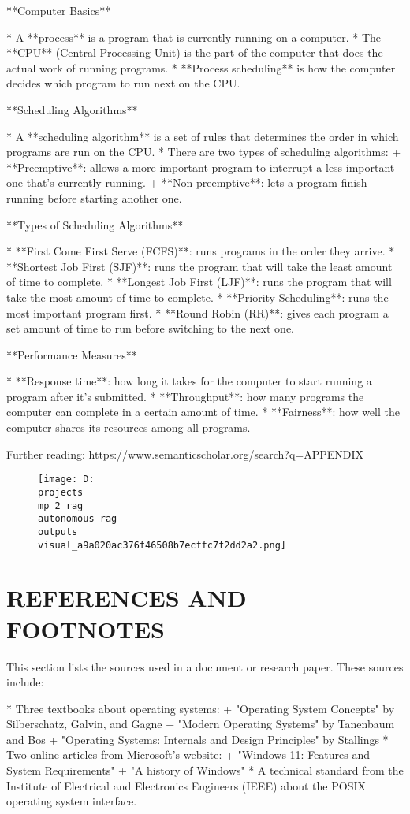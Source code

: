 \documentclass[12pt,a4paper]{article}
\begin{document}
**Computer Basics**

* A **process** is a program that is currently running on a computer.
* The **CPU** (Central Processing Unit) is the part of the computer that does the actual work of running programs.
* **Process scheduling** is how the computer decides which program to run next on the CPU.

**Scheduling Algorithms**

* A **scheduling algorithm** is a set of rules that determines the order in which programs are run on the CPU.
* There are two types of scheduling algorithms:
	+ **Preemptive**: allows a more important program to interrupt a less important one that's currently running.
	+ **Non-preemptive**: lets a program finish running before starting another one.

**Types of Scheduling Algorithms**

* **First Come First Serve (FCFS)**: runs programs in the order they arrive.
* **Shortest Job First (SJF)**: runs the program that will take the least amount of time to complete.
* **Longest Job First (LJF)**: runs the program that will take the most amount of time to complete.
* **Priority Scheduling**: runs the most important program first.
* **Round Robin (RR)**: gives each program a set amount of time to run before switching to the next one.

**Performance Measures**

* **Response time**: how long it takes for the computer to start running a program after it's submitted.
* **Throughput**: how many programs the computer can complete in a certain amount of time.
* **Fairness**: how well the computer shares its resources among all programs.

Further reading: https://www.semanticscholar.org/search?q=APPENDIX
\begin{figure}[h]
\centering
\texttt{[image: D:\\projects\\mp 2 rag\\autonomous rag\\outputs\\visual\_a9a020ac376f46508b7ecffc7f2dd2a2.png]}
\end{figure}
\section{REFERENCES AND FOOTNOTES}
This section lists the sources used in a document or research paper. These sources include:

* Three textbooks about operating systems:
	+ "Operating System Concepts" by Silberschatz, Galvin, and Gagne
	+ "Modern Operating Systems" by Tanenbaum and Bos
	+ "Operating Systems: Internals and Design Principles" by Stallings
* Two online articles from Microsoft's website:
	+ "Windows 11: Features and System Requirements"
	+ "A history of Windows"
* A technical standard from the Institute of Electrical and Electronics Engineers (IEEE) about the POSIX operating system interface.
\end{document}
